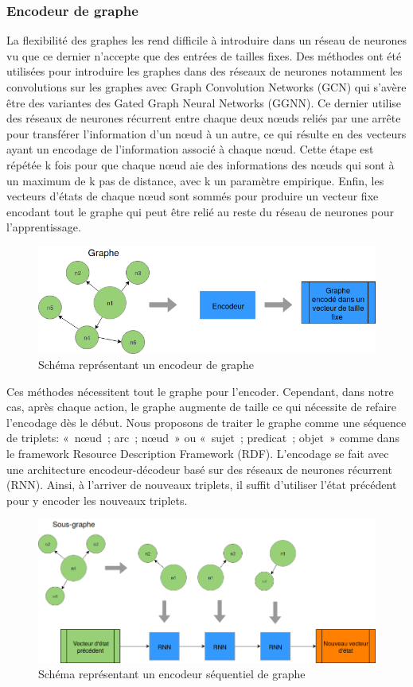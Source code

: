 	\subsubsection*{Encodeur de graphe}
	La flexibilité des graphes les rend difficile à introduire dans un réseau de neurones vu que ce dernier n’accepte que des entrées de tailles fixes. Des méthodes ont été utilisées pour introduire les graphes dans des réseaux de neurones notamment les convolutions sur les graphes avec Graph Convolution Networks (GCN)\cite{KipfW17} qui s’avère être des variantes des Gated Graph Neural Networks (GGNN)\cite{Li2016GatedGS}. Ce dernier utilise des réseaux de neurones récurrent entre chaque deux nœuds reliés par une arrête pour transférer l’information d’un nœud à un autre, ce qui résulte en des vecteurs ayant un encodage de l’information associé à chaque nœud. Cette étape est répétée k fois pour que chaque nœud aie des informations des nœuds qui sont à un maximum de k pas de distance, avec k un paramètre empirique. Enfin, les vecteurs d’états de chaque nœud sont sommés pour produire un vecteur fixe encodant tout le graphe qui peut être relié au reste du réseau de neurones pour l’apprentissage.
	\begin{figure}[H] 
		\centering
		\includegraphics[width=0.8\linewidth]{images/Conception/DM/encoder.png}
		\caption{Schéma représentant un encodeur de graphe}
		
	\end{figure}\label{encoder}
Ces méthodes nécessitent tout le graphe pour l’encoder. Cependant, dans notre cas, après chaque action, le graphe augmente de taille ce qui nécessite de refaire l’encodage dès le début. Nous proposons de traiter le graphe comme une séquence de triplets: « nœud ; arc ; nœud » ou « sujet ; predicat ; objet » comme dans le framework Resource Description Framework (RDF). L’encodage se fait avec une architecture encodeur-décodeur basé sur des réseaux de neurones récurrent (RNN). Ainsi, à l’arriver de nouveaux triplets, il suffit d’utiliser l’état précédent pour y encoder les nouveaux triplets.
\begin{figure}[H] 
	\centering
	\includegraphics[width=0.8\linewidth]{images/Conception/DM/encoder_seq.png}
	\caption{Schéma représentant un encodeur séquentiel de graphe}
	
\end{figure}\label{encoder_seq}
